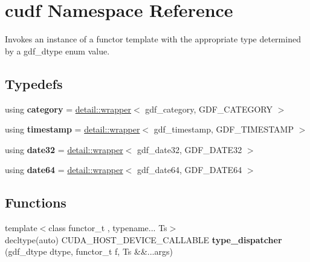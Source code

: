 \hypertarget{namespacecudf}{}\section{cudf Namespace Reference}
\label{namespacecudf}


Invokes an instance of a functor template with the appropriate type determined by a gdf\+\_\+dtype enum value.  


\subsection*{Typedefs}
\begin{DoxyCompactItemize}
\item 
using {\bfseries category} = \hyperlink{structcudf_1_1detail_1_1wrapper}{detail\+::wrapper}$<$ gdf\+\_\+category, G\+D\+F\+\_\+\+C\+A\+T\+E\+G\+O\+RY $>$\hypertarget{namespacecudf_a8c6e344a72404039eef838a8cb39295b}{}\label{namespacecudf_a8c6e344a72404039eef838a8cb39295b}

\item 
using {\bfseries timestamp} = \hyperlink{structcudf_1_1detail_1_1wrapper}{detail\+::wrapper}$<$ gdf\+\_\+timestamp, G\+D\+F\+\_\+\+T\+I\+M\+E\+S\+T\+A\+MP $>$\hypertarget{namespacecudf_a6916ffd2fdcad20b769afc3d4130140e}{}\label{namespacecudf_a6916ffd2fdcad20b769afc3d4130140e}

\item 
using {\bfseries date32} = \hyperlink{structcudf_1_1detail_1_1wrapper}{detail\+::wrapper}$<$ gdf\+\_\+date32, G\+D\+F\+\_\+\+D\+A\+T\+E32 $>$\hypertarget{namespacecudf_a788a6ac25db35f51d612644bebd86970}{}\label{namespacecudf_a788a6ac25db35f51d612644bebd86970}

\item 
using {\bfseries date64} = \hyperlink{structcudf_1_1detail_1_1wrapper}{detail\+::wrapper}$<$ gdf\+\_\+date64, G\+D\+F\+\_\+\+D\+A\+T\+E64 $>$\hypertarget{namespacecudf_a5da9e96ba9d677a713403fb3704600ef}{}\label{namespacecudf_a5da9e96ba9d677a713403fb3704600ef}

\end{DoxyCompactItemize}
\subsection*{Functions}
\begin{DoxyCompactItemize}
\item 
{\footnotesize template$<$class functor\+\_\+t , typename... Ts$>$ }\\decltype(auto) C\+U\+D\+A\+\_\+\+H\+O\+S\+T\+\_\+\+D\+E\+V\+I\+C\+E\+\_\+\+C\+A\+L\+L\+A\+B\+LE {\bfseries type\+\_\+dispatcher} (gdf\+\_\+dtype dtype, functor\+\_\+t f, Ts \&\&...args)\hypertarget{namespacecudf_a680bd4460ec432ed855cb77805fa2cdb}{}\label{namespacecudf_a680bd4460ec432ed855cb77805fa2cdb}

\end{DoxyCompactItemize}


